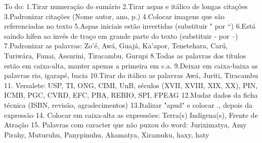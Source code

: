 To do:
1.Tirar numeração do sumário
2.Tirar aspas e itálico de longas citações
3.Padronizar citações (Nome autor, ano, p.)
4.Colocar imagens que são referenciadas no texto
5.Aspas iniciais estão invertidas (substituir " por ``)
6.Está saindo hífen ao invés de traço em grande parte do texto (substituir - por --)
7.Padronizar as palavras: Zo'é, Awá, Guajá, Ka'apor, Tenetehara, Carú, Turiwára, Funai, Assurini, Tiracambu, Gurupi
8.Todas as palavras dos títulos estão em caixa-alta, manter apenas a primeira em c.a.
9.Deixar em caixa-baixa as palavras rio, igarapé, bacia
10.Tirar do itálico as palavras Awá, Juriti, Tiracambu
11. Versalete: USP, TI, ONG, CIMI, UnB, séculos (XVII, XVIII, XIX, XX), PIN, ICMB, PGC, CVRD, EFC, PBA, REBIO, SPI, FPEAG 
12.Mudar dados da ficha técnica (ISBN, revisão, agradecimentos)
13.Italizar "apud" e colocar ., depois da expressão
14. Colocar em caixa-alta as expressões: Terra(s) Indígena(s), Frente de Atração
15. Palavras com caracter que não puxou do word: Juriximatya, Amy Pirahy, Muturuhu, Panypinuhu, Akamatya, Xiramuku, haxy, haty